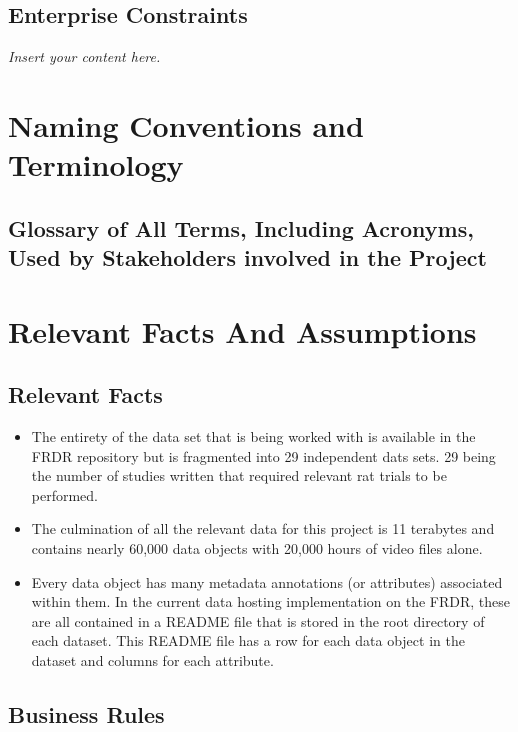 \documentclass[12pt]{article}
\newcommand{\lips}{\textit{Insert your content here.}}
\begin{document}
\subsection{Enterprise Constraints}
\lips

\section{Naming Conventions and Terminology}
\subsection{Glossary of All Terms, Including Acronyms, Used by Stakeholders
involved in the Project}

\printnoidxglossary[type=SWE, title={Software Engineering Terms}]
\printnoidxglossary[type=domain, title={Domain-Specific Research Terms}]
\printnoidxglossary[type=general, title={General Terms}]



\section{Relevant Facts And Assumptions}
\subsection{Relevant Facts}

\begin{itemize}
    \item The entirety of the data set that is being worked with is available in the FRDR repository
    but is fragmented into 29 independent dats sets. 29 being the number of studies written that required relevant
    rat trials to be performed.
    \item The culmination of all the relevant data for this project is 11 terabytes and contains nearly 60,000 data objects with
    20,000 hours of video files alone.
    \item Every data object has many metadata annotations (or attributes) associated within them. In the current data hosting
    implementation on the FRDR, these are all contained in a README file that is stored in the root directory of each dataset.
    This README file has a row for each data object in the dataset and columns for each attribute.
\end{itemize}

\subsection{Business Rules}
\end{document}
